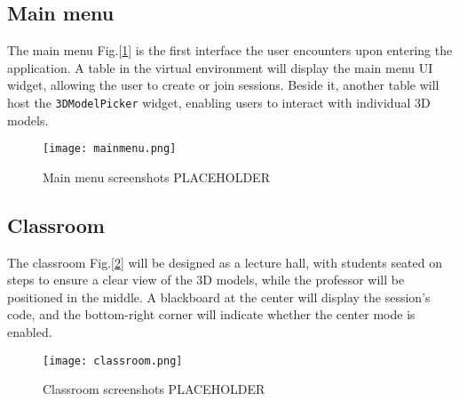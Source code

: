 \subsection{Main menu}
\noindent
The main menu Fig.[\ref{fig:mainmenuRoom}] is the first interface the user encounters upon entering the application. A table in the virtual environment will display the main menu \ac{UI} widget, allowing the user to create or join sessions.
Beside it, another table will host the \texttt{3DModelPicker} widget, enabling users to interact with individual 3D models.

\begin{figure}[ht]
    \centering
    \texttt{[image: mainmenu.png]}
    \caption{Main menu screenshots PLACEHOLDER}
    \label{fig:mainmenuRoom}
\end{figure}
\subsection{Classroom}
\noindent
The classroom Fig.[\ref{fig:classroom}] will be designed as a lecture hall, with students seated on steps to ensure a clear view of the 3D models, while the professor will be positioned in the middle.
A blackboard at the center will display the session's code, and the bottom-right corner will indicate whether the center mode is enabled.

\begin{figure}[ht]
    \centering
    \texttt{[image: classroom.png]}
    \caption{Classroom screenshots PLACEHOLDER}
    \label{fig:classroom}
\end{figure}

